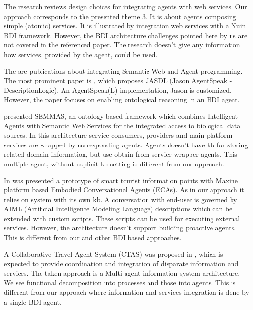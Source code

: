 \documentclass{llncs}
\begin{document}
The research \cite{dickinson2005Agents} reviews design choices for integrating agents with web services. Our approach corresponds to the presented theme 3. It is about agents composing simple (atomic) services. It is illustrated by integration web services with a Nuin \gls{BDI} framework. However, the \gls{BDI} architecture challenges pointed here by us are not covered in the referenced paper. The research doesn't give any information how services, provided by the agent, could be used.

The are publications about integrating  Semantic Web and Agent programming. The most prominent paper is \cite{klapiscak2009jasdl}, which proposes JASDL (Jason AgentSpeak - DescriptionLogic). An AgentSpeak(L) implementation, Jason \cite{bordini2007programming} is customized. However, the paper focuses on enabling ontological reasoning in an \gls{BDI} agent.

\cite{GarciaSanchez2008Combining} presented SEMMAS, an ontology-based framework which combines Intelligent Agents with Semantic Web Services for the integrated access to biological data
sources. In this architecture service consumers, providers and main platform services are wrapped by corresponding agents. Agents doesn't have \gls{kb} for storing related domain information, but use obtain from service wrapper agents. This multiple agent, without explicit \gls{kb} setting is different from our approach.

In \cite{Garrido2017SmartTourist} was presented a prototype of smart tourist information points with Maxine platform based Embodied Conversational Agents (ECAs). As in our approach it relies on system with its own \gls{kb}. %
A conversation with end-user is governed by AIML (Artificial Intelligence Modeling Language) descriptions which can be extended with custom scripts. These scripts can be used for executing external services. However, the architecture doesn't support building proactive agents. This is different from our and other \gls{BDI} based approaches.  

A Collaborative Travel Agent System (CTAS) was proposed in \cite{Chiu2009Collaborative}, which is expected to provide coordination and integration of disparate information and services. The taken approach is a Multi agent information system architecture. We see functional decomposition into  processes and those into agents. This is different from our approach where information and services integration is done by a single \gls{BDI} agent. %
\end{document}
